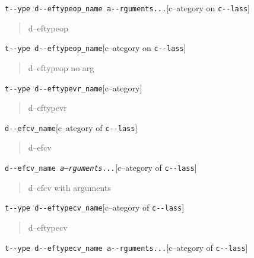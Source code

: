 \documentclass{book}
\begin{document}
\noindent\texttt{t{-}{-}ype d{-}{-}eftypeop\_name a{-}{-}rguments...}\hfill[c--ategory on \texttt{c{-}{-}lass}]



%
\begin{quote}
d--eftypeop
\end{quote}

\noindent\texttt{t{-}{-}ype d{-}{-}eftypeop\_name}\hfill[c--ategory on \texttt{c{-}{-}lass}]



%
\begin{quote}
d--eftypeop no arg
\end{quote}

\noindent\texttt{t{-}{-}ype d{-}{-}eftypevr\_name}\hfill[c--ategory]



%
\begin{quote}
d--eftypevr
\end{quote}

\noindent\texttt{d{-}{-}efcv\_name}\hfill[c--ategory of \texttt{c{-}{-}lass}]



%
\begin{quote}
d--efcv
\end{quote}

\noindent\texttt{d{-}{-}efcv\_name \EmbracOn{}\textnormal{\textsl{a--rguments...}}\EmbracOff{}}\hfill[c--ategory of \texttt{c{-}{-}lass}]



%
\begin{quote}
d--efcv with arguments
\end{quote}

\noindent\texttt{t{-}{-}ype d{-}{-}eftypecv\_name}\hfill[c--ategory of \texttt{c{-}{-}lass}]



%
\begin{quote}
d--eftypecv
\end{quote}

\noindent\texttt{t{-}{-}ype d{-}{-}eftypecv\_name a{-}{-}rguments...}\hfill[c--ategory of \texttt{c{-}{-}lass}]
\end{document}

